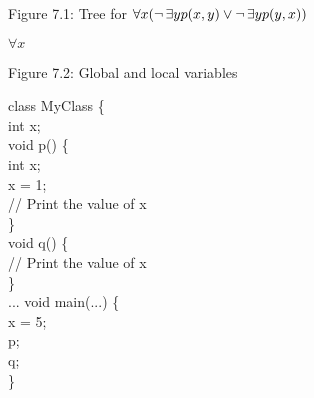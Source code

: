 \documentclass[style=simple,size=12pt]{powerdot}
\begin{document}
\begin{wideslide}[bm=,toc=]{Figure 7.1: Tree for
$\forall x(\mathop{\neg}\exists yp(x,y)\vee\mathop{\neg}\exists yp(y,x))$}
\begin{center}
\setlength{\GapWidth}{8mm}
\setlength{\GapDepth}{8mm}
\begin{bundle}{$\forall x$\rule[-1mm]{0mm}{1mm}}
\end{bundle}
\end{center}
\end{wideslide}

\begin{wideslide}[bm=,toc=]{Figure 7.2: Global and local variables}
\vspace*{-2ex}
\begin{program}
class MyClass \{\\
\>int x;\\
\>void p() \{\\
\>\>int x;\\
\>\>x = 1;\\
\>\>// Print the value of x\\
\>\}\\
\>void q() \{\\
\>\>// Print the value of x\\
\>\}\\
\>... void main(...) \{\\
\>x = 5;\\
\>p;\\
\>q;\\
\}
\end{program}
\end{wideslide}
\end{document}
